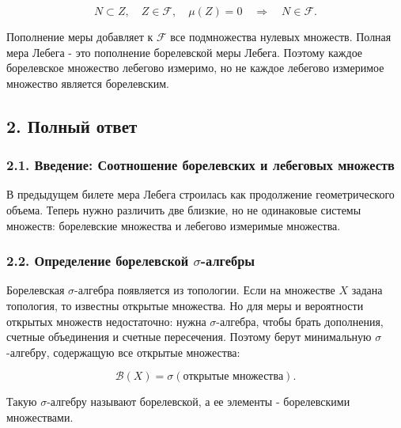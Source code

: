 \documentclass[
  11pt,
  a4paper,
]{article}
\begin{document}
\[
N\subset Z,\quad Z\in\mathcal F,\quad \mu(Z)=0
\quad\Longrightarrow\quad
N\in\mathcal F.
\]

Пополнение меры добавляет к \(\mathcal F\) все подмножества нулевых
множеств. Полная мера Лебега - это пополнение борелевской меры Лебега.
Поэтому каждое борелевское множество лебегово измеримо, но не каждое
лебегово измеримое множество является борелевским.

\subsection{2. Полный
ответ}\label{ux43fux43eux43bux43dux44bux439-ux43eux442ux432ux435ux442}

\subsubsection{2.1. Введение: Соотношение борелевских и лебеговых
множеств}\label{ux432ux432ux435ux434ux435ux43dux438ux435-ux441ux43eux43eux442ux43dux43eux448ux435ux43dux438ux435-ux431ux43eux440ux435ux43bux435ux432ux441ux43aux438ux445-ux438-ux43bux435ux431ux435ux433ux43eux432ux44bux445-ux43cux43dux43eux436ux435ux441ux442ux432}

В предыдущем билете мера Лебега строилась как продолжение
геометрического объема. Теперь нужно различить две близкие, но не
одинаковые системы множеств: борелевские множества и лебегово измеримые
множества.

\subsubsection{\texorpdfstring{2.2. Определение борелевской
\(\sigma\)-алгебры}{2.2. Определение борелевской \textbackslash sigma-алгебры}}\label{ux43eux43fux440ux435ux434ux435ux43bux435ux43dux438ux435-ux431ux43eux440ux435ux43bux435ux432ux441ux43aux43eux439-sigma-ux430ux43bux433ux435ux431ux440ux44b}

Борелевская \(\sigma\)-алгебра появляется из топологии. Если на
множестве \(X\) задана топология, то известны открытые множества. Но для
меры и вероятности открытых множеств недостаточно: нужна
\(\sigma\)-алгебра, чтобы брать дополнения, счетные объединения и
счетные пересечения. Поэтому берут минимальную \(\sigma\)-алгебру,
содержащую все открытые множества:

\[
\mathcal B(X)=\sigma(\text{открытые множества}).
\]

Такую \(\sigma\)-алгебру называют борелевской, а ее элементы -
борелевскими множествами.
\end{document}
